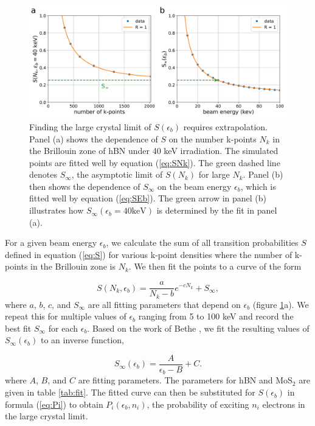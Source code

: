 \documentclass{article}
\begin{document}
\begin{figure}[H]
  \centering
  \includegraphics[width=\textwidth]{figS3.pdf}
  \caption{
    Finding the large crystal limit of $S(\epsilon_b)$ requires extrapolation.
    Panel (a) shows the dependence of $S$ on the number k-points $N_k$ in the
    Brillouin zone of hBN under 40 keV irradiation.
    The simulated points are fitted well by equation (\ref{eq:SNk}).
    The green dashed line denotes $S_\infty$, the asymptotic limit of $S(N_k)$
    for large $N_k$.
    Panel (b) then shows the dependence of $S_\infty$ on the beam energy
    $\epsilon_b$, which is fitted well by equation (\ref{eq:SEb}).
    The green arrow in panel (b) illustrates how $S_\infty(\epsilon_b=40\text{
    keV})$ is determined by the fit in panel (a).
  }
  \label{fig:Sfit}
\end{figure}

For a given beam energy $\epsilon_b$, we calculate the sum of all transition
probabilities $S$ defined in equation (\ref{eq:S}) for various k-point
densities where the number of k-points in the Brillouin zone is $N_k$.
We then fit the points to a curve of the form

\begin{equation}
  S(N_k, \epsilon_b)
  =
  \frac{a}{N_k-b}e^{-cN_k} + S_\infty,
  \label{eq:SNk}
\end{equation}
%
where $a$, $b$, $c$, and $S_\infty$ are all fitting parameters that depend on
$\epsilon_b$ (figure \ref{fig:Sfit}a).
We repeat this for multiple values of $\epsilon_b$ ranging from 5 to 100 keV
and record the best fit
$S_\infty$ for each
$\epsilon_b$.
Based on the work of Bethe \cite{Bethe1930, Susi2019, Kretschmer2020}, we fit the resulting values of
$S_\infty(\epsilon_b)$ to an inverse function,

\begin{equation}
  S_\infty(\epsilon_b)
  =
  \frac{A}{\epsilon_b - B} + C.
  \label{eq:SEb}
\end{equation}
%
where $A$, $B$, and $C$ are fitting parameters.  The parameters for hBN and
MoS$_2$ are given in table \ref{tab:fit}.
The fitted curve can then be substituted for $S(\epsilon_b)$ in formula
(\ref{eq:Pi}) to obtain $P_i(\epsilon_b, n_i)$, the probability of exciting
$n_i$ electrons in the large crystal limit.
\end{document}

